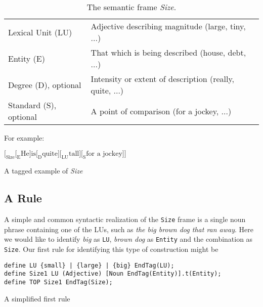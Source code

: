 \documentclass{llncs}
\begin{document}
\begin{table}[h]
\begin{center}
  \begin{tabular}{ l | l}
\hline
Lexical Unit (LU) & Adjective describing magnitude (large, tiny, ...) \\
Entity (E) & That which is being described (house, debt, ...) \\
Degree (D), optional & Intensity or extent of description (really, quite, ...) \\
Standard (S), optional & A point of comparison (for a jockey, ...) \\
\hline
    \end{tabular}
    \caption{The semantic frame \emph{Size}.}
\end{center}
\end{table}

For example:

\begin{table}[h]
\begin{center}
\begin{math}
\Big[_{\text{Size}}\Big[_{\text{E}}\text{He} \Big]
  \text{is} \Big[_{\text{D}} \text{quite} \Big] \Big[_{\text{LU}}\text{tall} \Big]
  \Big[_{\text{S}} \text{for a jockey} \Big] \Big]
\end{math}
\end{center}
\caption{A tagged example of \emph{Size}}
\end{table}

\subsection{A Rule}

A simple and common syntactic realization of the \verb+Size+ frame is a single
noun phrase containing one of the LUs, such as
\emph{the big brown dog that ran away}. Here we would like to identify \emph{big} as \verb+LU+,
\emph{brown dog} as \verb+Entity+ and the combination as \verb+Size+.
Our first rule for identifying this type of construction might be

\begin{table}[h]
\begin{center}
  \small
  \begin{framed}
\begin{verbatim}
define LU {small} | {large} | {big} EndTag(LU);
define Size1 LU (Adjective) [Noun EndTag(Entity)].t(Entity);
define TOP Size1 EndTag(Size);  
\end{verbatim}
\end{framed}
\normalsize
\caption{A simplified first rule}
\end{center}
\end{table}
\end{document}
